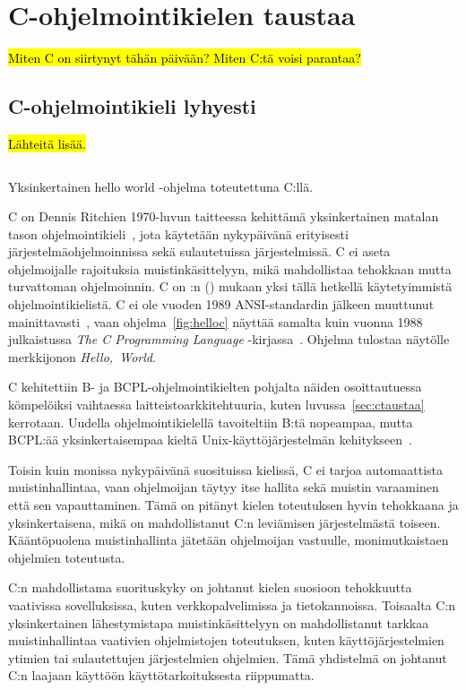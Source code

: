 \section{C-ohjelmointikielen taustaa}

\hl{Miten C on siirtynyt tähän päivään? Miten C:tä voisi parantaa?}

\subsection{C-ohjelmointikieli lyhyesti}
\label{sec:clyhyesti}

\hl{Lähteitä lisää.}

\begin{listing}[ht!]
    \inputminted{C}{koodi/hello.c}
    \caption{Yksinkertainen hello world -ohjelma toteutettuna C:llä.}
    \label{fig:helloc}
\end{listing}

C on Dennis Ritchien 1970-luvun taitteessa kehittämä yksinkertainen matalan
tason ohjelmointikieli~\citep{chistory}, jota käytetään nykypäivänä erityisesti
järjestelmäohjelmoinnissa sekä sulautetuissa järjestelmissä. C ei aseta
ohjelmoijalle rajoituksia muistinkäsittelyyn, mikä mahdollistaa tehokkaan mutta
turvattoman ohjelmoinnin. C on \citeauthor{tiobe}:n (\citeyear{tiobe}) mukaan
yksi tällä hetkellä käytetyimmistä ohjelmointikielistä. C ei ole vuoden 1989
ANSI-standardin jälkeen muuttunut mainittavasti~\citep{chistory, C18}, vaan
ohjelma~\ref{fig:helloc} näyttää samalta kuin vuonna 1988 julkaistussa
\emph{The C Programming Language} -kirjassa~\citep{krsecond}. Ohjelma tulostaa
näytölle merkkijonon \emph{Hello,~World}.

C kehitettiin B- ja BCPL-ohjelmointikielten pohjalta näiden osoittautuessa
kömpelöiksi vaihtaessa laitteistoarkkitehtuuria, kuten
luvussa~\ref{sec:ctaustaa} kerrotaan. Uudella ohjelmointikielellä tavoiteltiin
B:tä nopeampaa, mutta BCPL:ää yksinkertaisempaa kieltä Unix-käyttöjärjestelmän
kehitykseen~\citep{chistory}.

Toisin kuin monissa nykypäivänä suosituissa kielissä, C ei tarjoa automaattista
muistinhallintaa, vaan ohjelmoijan täytyy itse hallita sekä muistin varaaminen
että sen vapauttaminen. Tämä on pitänyt kielen toteutuksen hyvin tehokkaana ja
yksinkertaisena, mikä on mahdollistanut C:n leviämisen järjestelmästä toiseen.
Kääntöpuolena muistinhallinta jätetään ohjelmoijan vastuulle, monimutkaistaen
ohjelmien toteutusta.

C:n mahdollistama suorituskyky on johtanut kielen suosioon tehokkuutta
vaativissa sovelluksissa, kuten verkkopalvelimissa ja tietokannoissa.
Toisaalta C:n yksinkertainen lähestymistapa muistinkäsittelyyn on
mahdollistanut tarkkaa muistinhallintaa vaativien ohjelmistojen toteutuksen,
kuten käyttöjärjestelmien ytimien tai sulautettujen järjestelmien ohjelmien.
Tämä yhdistelmä on johtanut C:n laajaan käyttöön käyttötarkoituksesta
riippumatta.

